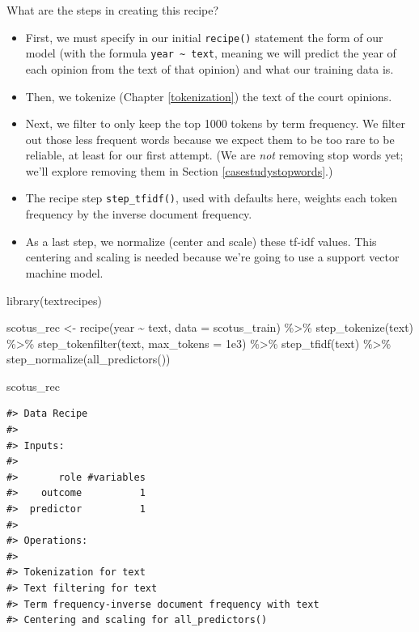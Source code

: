 \documentclass[
]{krantz}
\makeatletter
\newenvironment{Shaded}{\begin{snugshade}}{\end{snugshade}}
\newcommand{\AttributeTok}[1]{\textcolor[rgb]{0.77,0.63,0.00}{#1}}
\newcommand{\FloatTok}[1]{\textcolor[rgb]{0.00,0.00,0.81}{#1}}
\newcommand{\FunctionTok}[1]{\textcolor[rgb]{0.00,0.00,0.00}{#1}}
\newcommand{\NormalTok}[1]{#1}
\newcommand{\OtherTok}[1]{\textcolor[rgb]{0.56,0.35,0.01}{#1}}
\newcommand{\SpecialCharTok}[1]{\textcolor[rgb]{0.00,0.00,0.00}{#1}}
\newenvironment{kframe}{%
\medskip{}
\setlength{\fboxsep}{.8em}
 \def\at@end@of@kframe{}%
 \ifinner\ifhmode%
  \def\at@end@of@kframe{\end{minipage}}%
  \begin{minipage}{\columnwidth}%
 \fi\fi%
 \def\FrameCommand##1{\hskip\@totalleftmargin \hskip-\fboxsep
 \colorbox{shadecolor}{##1}\hskip-\fboxsep
     \hskip-\linewidth \hskip-\@totalleftmargin \hskip\columnwidth}%
 \MakeFramed {\advance\hsize-\width
   \@totalleftmargin\z@ \linewidth\hsize
   \@setminipage}}%
 {\par\unskip\endMakeFramed%
 \at@end@of@kframe}
\renewenvironment{Shaded}{\begin{kframe}}{\end{kframe}}
\makeatother
\begin{document}
What are the steps in creating this recipe?

\begin{itemize}
\item
  First, we must specify in our initial \texttt{recipe()} statement the form of our model (with the formula \texttt{year\ \textasciitilde{}\ text}, meaning we will predict the year of each opinion from the text of that opinion) and what our training data is.
\item
  Then, we tokenize (Chapter \ref{tokenization}) the text of the court opinions.
\item
  Next, we filter to only keep the top 1000 tokens by term frequency. We filter out those less frequent words because we expect them to be too rare to be reliable, at least for our first attempt. (We are \emph{not} removing stop words yet; we'll explore removing them in Section \ref{casestudystopwords}.)
\item
  The recipe step \texttt{step\_tfidf()}, used with defaults here, weights each token frequency by the inverse document frequency.
\item
  As a last step, we normalize (center and scale) these tf-idf values. This centering and scaling is needed because we're going to use a support vector machine model.
\end{itemize}

\begin{Shaded}
\begin{Highlighting}[]
\FunctionTok{library}\NormalTok{(textrecipes)}

\NormalTok{scotus\_rec }\OtherTok{\textless{}{-}} \FunctionTok{recipe}\NormalTok{(year }\SpecialCharTok{\textasciitilde{}}\NormalTok{ text, }\AttributeTok{data =}\NormalTok{ scotus\_train) }\SpecialCharTok{\%\textgreater{}\%}
  \FunctionTok{step\_tokenize}\NormalTok{(text) }\SpecialCharTok{\%\textgreater{}\%}
  \FunctionTok{step\_tokenfilter}\NormalTok{(text, }\AttributeTok{max\_tokens =} \FloatTok{1e3}\NormalTok{) }\SpecialCharTok{\%\textgreater{}\%}
  \FunctionTok{step\_tfidf}\NormalTok{(text) }\SpecialCharTok{\%\textgreater{}\%}
  \FunctionTok{step\_normalize}\NormalTok{(}\FunctionTok{all\_predictors}\NormalTok{())}

\NormalTok{scotus\_rec}
\end{Highlighting}
\end{Shaded}

\begin{verbatim}
#> Data Recipe
#> 
#> Inputs:
#> 
#>       role #variables
#>    outcome          1
#>  predictor          1
#> 
#> Operations:
#> 
#> Tokenization for text
#> Text filtering for text
#> Term frequency-inverse document frequency with text
#> Centering and scaling for all_predictors()
\end{verbatim}
\end{document}
